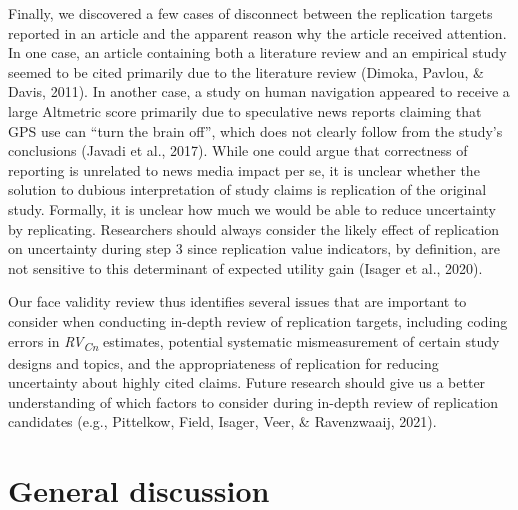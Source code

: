 \documentclass[
  man,floatsintext]{apa6}
\begin{document}
Finally, we discovered a few cases of disconnect between the replication targets reported in an article and the apparent reason why the article received attention. In one case, an article containing both a literature review and an empirical study seemed to be cited primarily due to the literature review (Dimoka, Pavlou, \& Davis, 2011). In another case, a study on human navigation appeared to receive a large Altmetric score primarily due to speculative news reports claiming that GPS use can ``turn the brain off'', which does not clearly follow from the study's conclusions (Javadi et al., 2017). While one could argue that correctness of reporting is unrelated to news media impact per se, it is unclear whether the solution to dubious interpretation of study claims is replication of the original study. Formally, it is unclear how much we would be able to reduce uncertainty by replicating. Researchers should always consider the likely effect of replication on uncertainty during step 3 since replication value indicators, by definition, are not sensitive to this determinant of expected utility gain (Isager et al., 2020).

Our face validity review thus identifies several issues that are important to consider when conducting in-depth review of replication targets, including coding errors in \emph{RV\textsubscript{Cn}} estimates, potential systematic mismeasurement of certain study designs and topics, and the appropriateness of replication for reducing uncertainty about highly cited claims. Future research should give us a better understanding of which factors to consider during in-depth review of replication candidates (e.g., Pittelkow, Field, Isager, Veer, \& Ravenzwaaij, 2021).

\hypertarget{general-discussion}{%
\section{General discussion}\label{general-discussion}}
\end{document}
